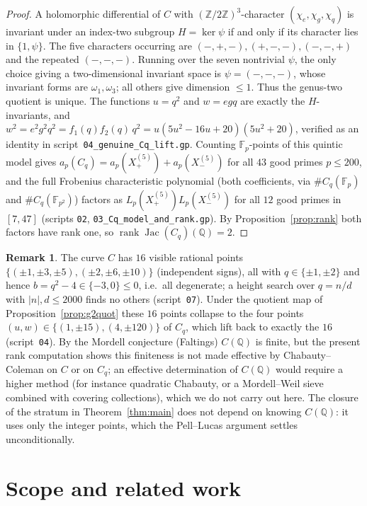 \documentclass[11pt,reqno]{amsart}
\theoremstyle{plain}
\theoremstyle{definition}
\newtheorem{remark}[theorem]{Remark}
\newcommand{\Q}{\mathbb{Q}}
\newcommand{\Z}{\mathbb{Z}}
\newcommand{\F}{\mathbb{F}}
\DeclareMathOperator{\Jac}{Jac}
\DeclareMathOperator{\rank}{rank}
\begin{document}
\begin{proof}
A holomorphic differential of $C$ with $(\Z/2\Z)^3$-character
$(\chi_e,\chi_g,\chi_q)$ is invariant under an index-two subgroup
$H=\ker\psi$ if and only if its character lies in $\{1,\psi\}$. The five
characters occurring are $(-,+,-),(+,-,-),(-,-,+)$ and the repeated
$(-,-,-)$. Running over the seven nontrivial $\psi$, the only choice giving a
two-dimensional invariant space is $\psi=(-,-,-)$, whose invariant forms are
$\omega_1,\omega_3$; all others give dimension $\le1$. Thus the genus-two
quotient is unique. The functions $u=q^2$ and $w=egq$ are exactly the
$H$-invariants, and $w^2=e^2g^2q^2=f_1(q)f_2(q)\,q^2=u(5u^2-16u+20)(5u^2+20)$,
verified as an identity in script~\texttt{04\_genuine\_Cq\_lift.gp}. Counting
$\F_p$-points of this quintic model gives $a_p(C_q)=a_p(X_+^{(5)})+a_p(X_-^{(5)})$
for all $43$ good primes $p\le200$, and the full Frobenius characteristic
polynomial (both coefficients, via $\#C_q(\F_p)$ and $\#C_q(\F_{p^2})$) factors
as $L_p(X_+^{(5)})L_p(X_-^{(5)})$ for all $12$ good primes in $[7,47]$ (scripts
\texttt{02}, \texttt{03\_Cq\_model\_and\_rank.gp}). By
Proposition~\ref{prop:rank} both factors have rank one, so
$\rank\Jac(C_q)(\Q)=2$.
\end{proof}

\begin{remark}\label{rem:knownpts}
The curve $C$ has $16$ visible rational points
$\{(\pm1,\pm3,\pm5),(\pm2,\pm6,\pm10)\}$ (independent signs), all with
$q\in\{\pm1,\pm2\}$ and hence $b=q^2-4\in\{-3,0\}\le0$, i.e.\ all degenerate; a
height search over $q=n/d$ with $|n|,d\le2000$ finds no others
(script~\texttt{07}). Under the quotient map of
Proposition~\ref{prop:g2quot} these $16$ points collapse to the four points
$(u,w)\in\{(1,\pm15),(4,\pm120)\}$ of $C_q$, which lift back to exactly the $16$
(script~\texttt{04}). By the Mordell conjecture (Faltings) $C(\Q)$ is finite,
but the present rank computation shows this finiteness is not made effective by
Chabauty--Coleman on $C$ or on $C_q$; an effective determination of $C(\Q)$
would require a higher method (for instance quadratic Chabauty, or a Mordell--Weil
sieve combined with covering collections), which we do not carry out here. The
closure of the stratum in Theorem~\ref{thm:main} does not depend on knowing
$C(\Q)$: it uses only the integer points, which the Pell--Lucas argument settles
unconditionally.
\end{remark}

\section{Scope and related work}\label{sec:scope}
\end{document}
